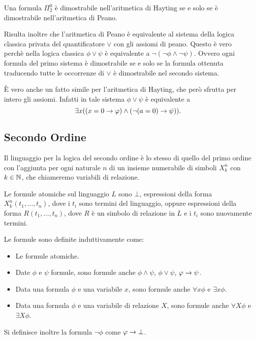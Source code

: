 \documentclass[]{marticle}
\begin{document}
\begin{block}[Teorema]
    Una formula $\Pi^0_2$ \`e dimostrabile nell'aritmetica di Hayting se e solo
    se \`e dimostrabile nell'aritmetica di Peano.
\end{block}

Risulta inoltre che l'aritmetica di Peano \`e equivalente al sistema della
logica classica privata del quantificatore $\lor$ con gli assiomi di peano.
Questo \`e vero perch\`e nella logica classica $\phi\lor\psi$ \`e equivalente a
$\lnot (\lnot\phi \land \lnot \psi)$. Ovvero ogni formula del primo sistema \`e
dimostrabile se e solo se la formula ottenuta traducendo tutte le occorrenze di
$\lor$ \`e dimostrabile nel secondo sistema.

\`E vero anche un fatto simile per l'aritmetica di Hayting, che per\`o sfrutta
per intero gli assiomi. Infatti in tale sistema $\phi\lor\psi$ \`e equivalente a
\[
    \exists x ((x=0 \rightarrow \varphi) \land (\lnot (a=0)\rightarrow\psi)).
\]

\subsection{Secondo Ordine}
\begin{block}[Definizione]
    Il linguaggio per la logica del secondo ordine \`e lo stesso di quello del
    primo ordine con l'aggiunta per ogni naturale $n$ di un insieme numerabile
    di simboli $X_k^n$ con $k\in\mathbb{N}$, che chiameremo variabili di relazione.  
    
    Le formule atomiche sul linguaggio $L$ sono $\bot$, espressioni della forma
    $X^n_k(t_1, \dots, t_n)$, dove i $t_i$ sono termini del linguaggio, oppure
    espressioni della forma $R(t_1, \dots, t_n)$, dove $R$ \`e un simbolo di
    relazione in $L$ e i $t_i$ sono nuovamente termini.

    Le formule sono definite induttivamente come:
    \begin{itemize}
        \item Le formule atomiche.
        \item Date $\phi$ e $\psi$ formule, sono formule anche $\phi \land
            \psi$, $\phi \lor \psi$, $\varphi \rightarrow \psi$.
        \item Data una formula $\phi$ e una variabile $x$, sono formule anche
            $\forall x \phi$ e $\exists x \phi$.
        \item Data una formula $\phi$ e una variabile di relazione $X$, sono
            formule anche $\forall X \phi$ e $\exists X \phi$.
    \end{itemize}
    Si definisce inoltre la formula $\lnot \phi$ come $\varphi \rightarrow \bot$.
\end{block} 
\end{document}
